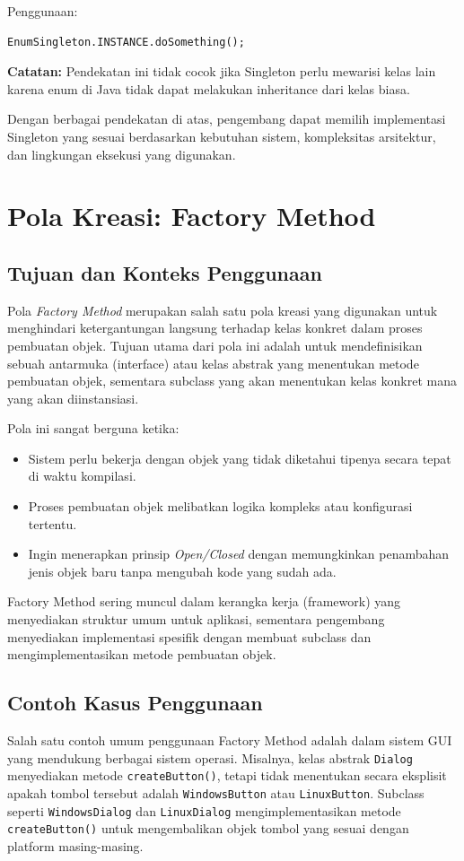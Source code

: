 Penggunaan:
\begin{lstlisting}[style=JavaStyle]
	EnumSingleton.INSTANCE.doSomething();
\end{lstlisting}

\textbf{Catatan:} Pendekatan ini tidak cocok jika Singleton perlu mewarisi kelas lain karena enum di Java tidak dapat melakukan inheritance dari kelas biasa.

\vspace{10pt}
Dengan berbagai pendekatan di atas, pengembang dapat memilih implementasi Singleton yang sesuai berdasarkan kebutuhan sistem, kompleksitas arsitektur, dan lingkungan eksekusi yang digunakan.

\section{Pola Kreasi: Factory Method}

\subsection{Tujuan dan Konteks Penggunaan}
Pola \textit{Factory Method} merupakan salah satu pola kreasi yang digunakan untuk menghindari ketergantungan langsung terhadap kelas konkret dalam proses pembuatan objek. Tujuan utama dari pola ini adalah untuk mendefinisikan sebuah antarmuka (interface) atau kelas abstrak yang menentukan metode pembuatan objek, sementara subclass yang akan menentukan kelas konkret mana yang akan diinstansiasi.

Pola ini sangat berguna ketika:
\begin{itemize}
	\item Sistem perlu bekerja dengan objek yang tidak diketahui tipenya secara tepat di waktu kompilasi.
	\item Proses pembuatan objek melibatkan logika kompleks atau konfigurasi tertentu.
	\item Ingin menerapkan prinsip \textit{Open/Closed} dengan memungkinkan penambahan jenis objek baru tanpa mengubah kode yang sudah ada.
\end{itemize}

Factory Method sering muncul dalam kerangka kerja (framework) yang menyediakan struktur umum untuk aplikasi, sementara pengembang menyediakan implementasi spesifik dengan membuat subclass dan mengimplementasikan metode pembuatan objek.

\subsection{Contoh Kasus Penggunaan}
Salah satu contoh umum penggunaan Factory Method adalah dalam sistem GUI yang mendukung berbagai sistem operasi. Misalnya, kelas abstrak \texttt{Dialog} menyediakan metode \texttt{createButton()}, tetapi tidak menentukan secara eksplisit apakah tombol tersebut adalah \texttt{WindowsButton} atau \texttt{LinuxButton}. Subclass seperti \texttt{WindowsDialog} dan \texttt{LinuxDialog} mengimplementasikan metode \texttt{createButton()} untuk mengembalikan objek tombol yang sesuai dengan platform masing-masing.

